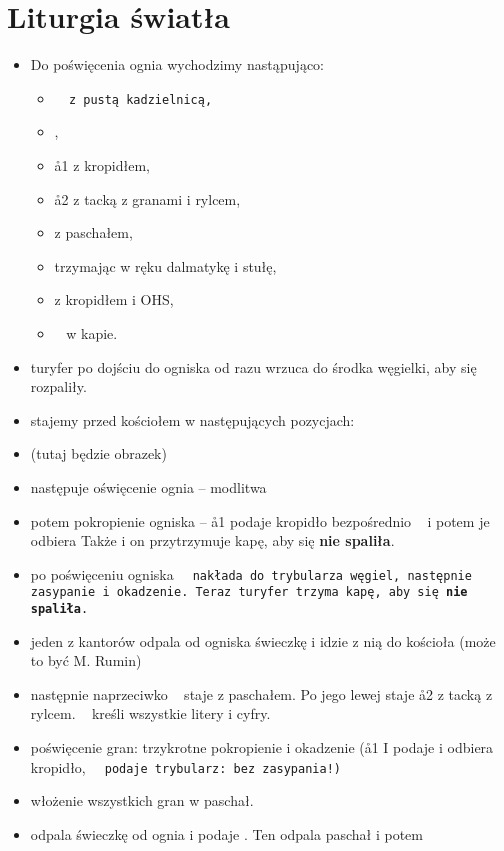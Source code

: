 \section{Liturgia światła}

\begin{itemize}
	\item Do poświęcenia ognia wychodzimy nastąpująco:
	      \begin{itemize}
		      \item \tt~ z pustą kadzielnicą,
		      \item {},
		      \item \aa1 z kropidłem,
		      \item \aa2 z tacką z granami i rylcem,
		      \item {} z paschałem,
		      \item {} trzymając w ręku dalmatykę i stułę,
		      \item {} z kropidłem i OHS,
		      \item \ii~ w kapie.
	      \end{itemize}
	\item turyfer po dojściu do ogniska od razu wrzuca do środka węgielki, aby
	      się rozpaliły.
	\item stajemy przed kościołem w następujących pozycjach:
	\item (tutaj będzie obrazek)
	\item następuje oświęcenie ognia -- modlitwa
	\item potem pokropienie ogniska -- \aa1 podaje kropidło bezpośrednio \ii~ i
	      potem je odbiera Także i on przytrzymuje kapę, aby się \textbf{nie
	      spaliła}.
	\item po poświęceniu ogniska \tt~ nakłada do trybularza węgiel, następnie
	      zasypanie i okadzenie. Teraz turyfer trzyma kapę, aby się \textbf{nie
	      spaliła}.
	\item jeden z kantorów odpala od ogniska świeczkę i idzie z nią do kościoła
	      (może to być M. Rumin)
	\item następnie naprzeciwko \ii~ staje \mm z paschałem. Po jego lewej staje
	      \aa2 z tacką z rylcem. \ii~ kreśli wszystkie litery i cyfry.
	\item poświęcenie gran: trzykrotne pokropienie i okadzenie (\aa1 I podaje i
	      odbiera kropidło, \tt~ podaje trybularz: bez zasypania!)
	\item włożenie wszystkich gran w paschał.
	\item {} odpala świeczkę od ognia i podaje \ii. Ten odpala paschał i potem

\end{itemize}
